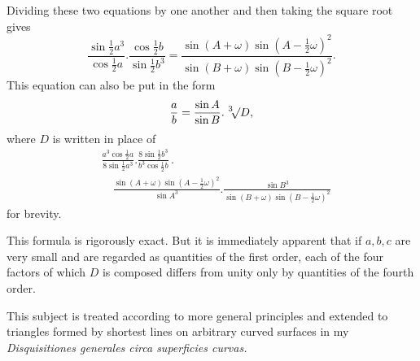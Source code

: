 \noindent Dividing these two equations by one another and then taking the square root gives
\[
\frac{\sin\tfrac12 a^3}{\cos\tfrac12 a}.\frac{\cos\tfrac12 b}{\sin\tfrac12 b^3}
=\frac{\sin(A+\omega)\sin(A-\tfrac12\omega)^2}{\sin(B+\omega)\sin(B-\tfrac12\omega)^2}.
\]
\noindent This equation can also be put in the form
\[
\frac ab=\frac{\sin A}{\sin B}.\mkern6mu{}^3\mkern-4mu\mathord{\surd}D,
\]
\noindent where $D$ is written in place of
\[
\begin{aligned}
&\frac{a^3\cos\tfrac12 a}{8\sin\tfrac12 a^3}.\frac{8\sin\tfrac12 b^3}{b^3\cos\tfrac12 b}\, .\\[5pt]
&\quad\frac{\sin(A+\omega)\sin(A-\tfrac12\omega)^2}{\sin A^3}.\frac{\sin B^3}{\sin(B+\omega)\sin(B-\tfrac12\omega)^2}
\end{aligned}
\]
\noindent for brevity.

This formula is rigorously exact. But it is immediately apparent that if $a,b,c$ are very small and are regarded as quantities of the first order, each of the four factors of which $D$ is composed differs from unity only by quantities of the fourth order.

This subject is treated according to more general principles and extended to triangles formed by shortest lines on arbitrary curved surfaces in my \textit{Disquisitiones generales circa superficies curvas.}

